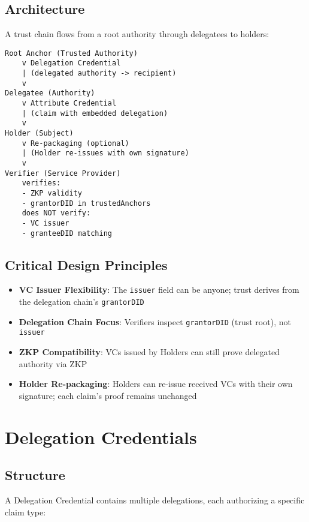 \subsection{Architecture}

A trust chain flows from a root authority through delegatees to holders:

\begin{center}
\begin{verbatim}
Root Anchor (Trusted Authority)
    v Delegation Credential
    | (delegated authority -> recipient)
    v
Delegatee (Authority)
    v Attribute Credential
    | (claim with embedded delegation)
    v
Holder (Subject)
    v Re-packaging (optional)
    | (Holder re-issues with own signature)
    v
Verifier (Service Provider)
    verifies:
    - ZKP validity
    - grantorDID in trustedAnchors
    does NOT verify:
    - VC issuer
    - granteeDID matching
\end{verbatim}
\end{center}

\subsection{Critical Design Principles}

\begin{itemize}
  \item \textbf{VC Issuer Flexibility}: The \texttt{issuer} field can be anyone; trust derives from the delegation chain's \texttt{grantorDID}
  \item \textbf{Delegation Chain Focus}: Verifiers inspect \texttt{grantorDID} (trust root), not \texttt{issuer}
  \item \textbf{ZKP Compatibility}: VCs issued by Holders can still prove delegated authority via ZKP
  \item \textbf{Holder Re-packaging}: Holders can re-issue received VCs with their own signature; each claim's proof remains unchanged
\end{itemize}

\section{Delegation Credentials}

\subsection{Structure}

A Delegation Credential contains multiple delegations, each authorizing a specific claim type:

